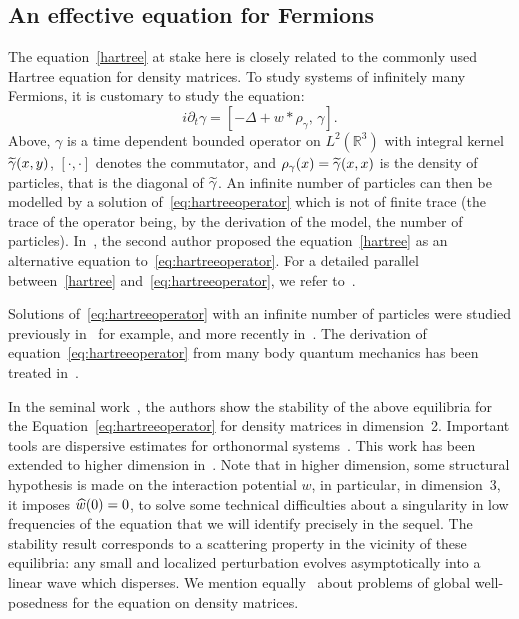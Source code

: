 \documentclass[AHL, Unicode, longabstracts,published]{cedram}
\newcommand{\R}{\mathbb{R}}
\newcommand{\pa}{\partial}
\let\oldtilde\tilde
\renewcommand*{\tilde}[1]{\mathchoice{\widetilde{#1}}{\widetilde{#1}}{\oldtilde{#1}}{\oldtilde{#1}}}
\let\oldhat\hat
\renewcommand*{\hat}[1]{\mathchoice{\widehat{#1}}{\widehat{#1}}{\oldhat{#1}}{\oldhat{#1}}}
\begin{document}
\subsection{An effective equation for Fermions}
The equation~\eqref{hartree} at stake here is closely related to the commonly used Hartree equation for density matrices. To study systems of infinitely many Fermions, it is customary to study the equation:
\begin{equation} \label{eq:hartreeoperator} i\pa_t \gamma = [-\Delta +w*\rho_{\gamma},\,\gamma].
\end{equation} 
Above, $\gamma$ is a time dependent bounded operator on $L^2(\R^3)$ with integral kernel $\tilde \gamma (x,y) $, $[\cdot,\cdot]$ denotes the commutator, and $\rho_{\gamma}(x)=\tilde \gamma (x,x)$ is the density of particles, that is the diagonal of $\tilde \gamma$. An infinite number of particles can then be modelled by a solution of~\eqref{eq:hartreeoperator} which is not of finite trace (the trace of the operator being, by the derivation of the model, the number of particles). In~\cite{dS}, the second author proposed the equation~\eqref{hartree} as an alternative equation to~\eqref{eq:hartreeoperator}. For a detailed parallel between~\eqref{hartree} and~\eqref{eq:hartreeoperator}, we refer to~\cite{CodS,dS,CdS2}.

Solutions of~\eqref{eq:hartreeoperator} with an infinite number of particles were studied previously in~\cite{BPF,BPF2,C,Z} for example, and more recently in~\cite{CHP,CHP2,lewsab2,lewsabI}. The derivation of equation~\eqref{eq:hartreeoperator} from many body quantum mechanics has been treated in~\cite{BEGMY,BGGM,BJPSS,derfer3,EESY,derfer5}.

In the seminal work~\cite{lewsab2}, the authors show the stability of the above equilibria for the Equation~\eqref{eq:hartreeoperator} for density matrices in dimension~2. Important tools are dispersive estimates for orthonormal systems~\cite{FLLS,FS}. This work has been extended to higher dimension in~\cite{CHP2}. Note that in higher dimension, some structural hypothesis is made on the interaction potential $w$, in particular, in dimension~$3$, it imposes $\hat w(0) = 0$, to solve some technical difficulties about a singularity in low frequencies of the equation that we will identify precisely in the sequel. The stability result corresponds to a scattering property in the vicinity of these equilibria: any small and localized perturbation evolves asymptotically into a linear wave which disperses. We mention equally~\cite{CHP,lewsabI} about problems of global well-posedness for the equation on density matrices.
\end{document}
